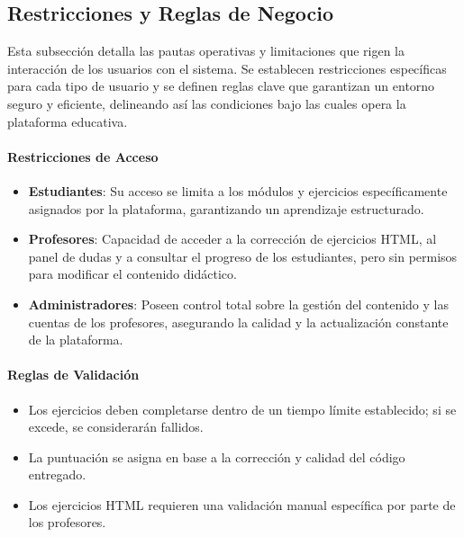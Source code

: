\subsection{Restricciones y Reglas de Negocio}

Esta subsección detalla las pautas operativas y limitaciones que rigen la interacción de los usuarios con el sistema. Se establecen restricciones específicas para cada tipo de usuario y se definen reglas clave que garantizan un entorno seguro y eficiente, delineando así las condiciones bajo las cuales opera la plataforma educativa.

\paragraph{Restricciones de Acceso}
\begin{itemize}
\item \textbf{Estudiantes}: Su acceso se limita a los módulos y ejercicios específicamente asignados por la plataforma, garantizando un aprendizaje estructurado.
\item \textbf{Profesores}: Capacidad de acceder a la corrección de ejercicios HTML, al panel de dudas y a consultar el progreso de los estudiantes, pero sin permisos para modificar el contenido didáctico.
\item \textbf{Administradores}: Poseen control total sobre la gestión del contenido y las cuentas de los profesores, asegurando la calidad y la actualización constante de la plataforma.
\end{itemize}

\paragraph{Reglas de Validación}
\begin{itemize}
\item Los ejercicios deben completarse dentro de un tiempo límite establecido; si se excede, se considerarán fallidos.
\item La puntuación se asigna en base a la corrección y calidad del código entregado.
\item Los ejercicios HTML requieren una validación manual específica por parte de los profesores.
\end{itemize}

